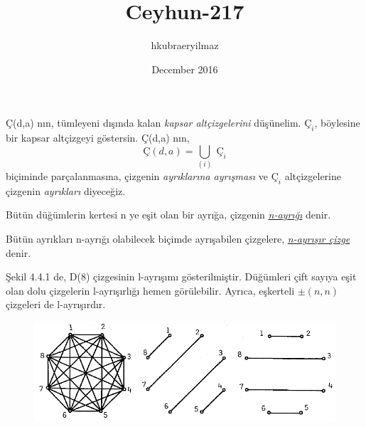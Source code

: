 \documentclass[11pt]{amsbook}
\title{Ceyhun-217}
\author{hkubraeryilmaz }
\date{December 2016}
\begin{document}

Ç(d,a) nın, tümleyeni dışında kalan \textit{kapsar altçizgelerini} düşünelim. $Ç_i$, böylesine bir kapsar altçizgeyi göstersin. Ç(d,a) nın,
\[
    Ç(d,a) = \underset{(i)}{\bigcup} \; Ç_i
\]
biçiminde parçalanmasına, çizgenin \textit{ayrıklarına ayrışması} ve $Ç_i$ altçizgelerine çizgenin \textit{ayrıkları} diyeceğiz.
\
\begin{definition}
    Bütün düğümlerin kertesi n ye eşit olan bir ayrığa, çizgenin \textit{\underline{n-ayrığı}} denir.
\end{definition}

\begin{definition}
    Bütün ayrıkları n-ayrığı olabilecek biçimde ayrışabilen çizgelere, \textit{\underline{n-ayrışır çizge}} denir. 
\end{definition}

Şekil 4.4.1 de, D(8) çizgesinin l-ayrışımı gösterilmiştir. Düğümleri çift sayıya eşit olan dolu çizgelerin l-ayrışırlığı hemen görülebilir. Ayrıca, eşkerteli $\pm (n,n)$ çizgeleri de l-ayrışırdır. 

\begin{figure}
    \includegraphics[width=\linewidth]{images/ceyhun-217-fig01.png}
    \caption{}
\end{figure}
\end{document}
